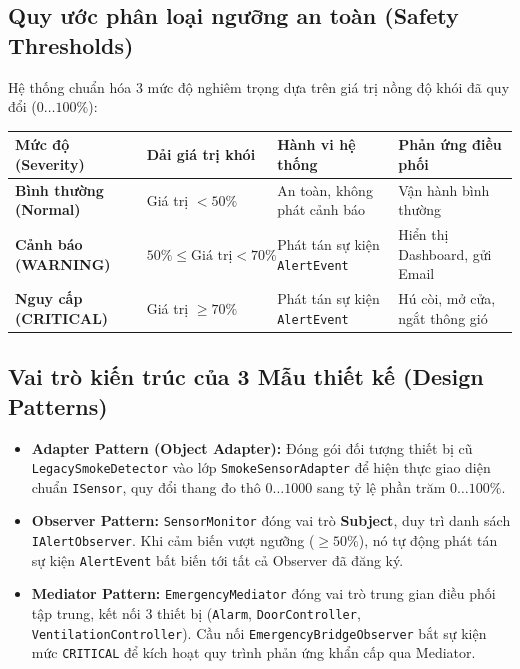 \documentclass[11pt,a4paper]{article}
\begin{document}
\subsection{Quy ước phân loại ngưỡng an toàn (Safety Thresholds)}
Hệ thống chuẩn hóa 3 mức độ nghiêm trọng dựa trên giá trị nồng độ khói đã quy đổi ($0 \dots 100\%$):
\begin{table}[H]
\centering
\footnotesize
\renewcommand{\arraystretch}{1.12}
\begin{tabular}{p{3.2cm}p{2.8cm}p{5.0cm}p{4.2cm}}
\toprule
\textbf{Mức độ (Severity)} & \textbf{Dải giá trị khói} & \textbf{Hành vi hệ thống} & \textbf{Phản ứng điều phối} \\
\midrule
\textbf{Bình thường (Normal)} & Giá trị $< 50\%$ & An toàn, không phát cảnh báo & Vận hành bình thường \\
\textbf{Cảnh báo (WARNING)} & $50\% \le \text{Giá trị} < 70\%$ & Phát tán sự kiện \texttt{AlertEvent} & Hiển thị Dashboard, gửi Email \\
\textbf{Nguy cấp (CRITICAL)} & Giá trị $\ge 70\%$ & Phát tán sự kiện \texttt{AlertEvent} & Hú còi, mở cửa, ngắt thông gió \\
\bottomrule
\end{tabular}
\end{table}

\subsection{Vai trò kiến trúc của 3 Mẫu thiết kế (Design Patterns)}
\begin{itemize}[itemsep=1.0pt]
    \item \textbf{Adapter Pattern (Object Adapter):} Đóng gói đối tượng thiết bị cũ \texttt{LegacySmokeDetector} vào lớp \texttt{SmokeSensorAdapter} để hiện thực giao diện chuẩn \texttt{ISensor}, quy đổi thang đo thô $0 \dots 1000$ sang tỷ lệ phần trăm $0 \dots 100\%$.
    \item \textbf{Observer Pattern:} \texttt{SensorMonitor} đóng vai trò \textbf{Subject}, duy trì danh sách \texttt{IAlertObserver}. Khi cảm biến vượt ngưỡng ($\ge 50\%$), nó tự động phát tán sự kiện \texttt{AlertEvent} bất biến tới tất cả Observer đã đăng ký.
    \item \textbf{Mediator Pattern:} \texttt{EmergencyMediator} đóng vai trò trung gian điều phối tập trung, kết nối 3 thiết bị (\texttt{Alarm}, \texttt{DoorController}, \texttt{VentilationController}). Cầu nối \texttt{EmergencyBridgeObserver} bắt sự kiện mức \texttt{CRITICAL} để kích hoạt quy trình phản ứng khẩn cấp qua Mediator.
\end{itemize}
\end{document}
